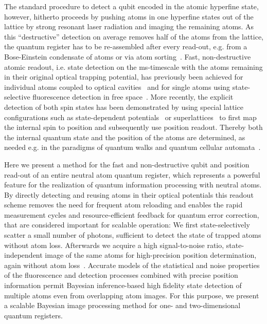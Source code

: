 \documentclass[aps,prl,twocolumn,english,showpacs]{revtex4-1}
\begin{document}
The standard procedure to detect a qubit encoded in the atomic hyperfine state, however, hitherto proceeds by pushing atoms in one hyperfine states out of the lattice by strong resonant laser radiation and imaging the remaining atoms. As this ``destructive'' detection on average removes half of the atoms from the lattice, the quantum register has to be re-assembled after every read-out, e.g. from a Bose-Einstein condensate of atoms or via atom sorting~\cite{Robens2017sorting}. 
Fast, non-destructive atomic readout, i.e. state detection on the ms-timescale with the atoms remaining in their original optical trapping potential, has previously been achieved for individual atoms coupled to optical cavities~\cite{gehr2010,bochmann2010,reick2010} and for single atoms using state-selective fluorescence detection in free space~\cite{gibbons2011,fuhrmanek2011}. More recently, the explicit detection of both spin states has been demonstrated by using special lattice configurations such as state-dependent potentials~\cite{robens2017atomic} or superlattices~\cite{boll2016spin} to first map the internal spin to position and subsequently use position readout. Thereby both the internal quantum state and the position of the atoms are determined, as needed e.g. in the paradigms of quantum walks and quantum cellular automata~\cite{robens2017atomic,Meyer1996,karski2009quantum}.

Here we present a method for the fast and non-destructive qubit and position read-out of an entire neutral atom quantum register, which represents a powerful feature for the realization of quantum information processing with neutral atoms. By directly detecting and reusing atoms in their optical potentials this readout scheme removes the need for frequent atom reloading and enables the rapid measurement cycles and resource-efficient feedback for quantum error correction, that are considered important for scalable operation: We first state-selectively scatter a small number of photons, sufficient to detect the state of trapped atoms without atom loss. Afterwards we acquire a high signal-to-noise ratio, state-independent image of the same atoms for high-precision position determination, again without atom loss~\cite{Alberti2016SuperResolution}. Accurate models of the statistical and noise properties of the fluorescence and detection processes combined with precise position information permit Bayesian inference-based high fidelity state detection of multiple atoms even from overlapping atom images. For this purpose, we present a scalable Bayesian image processing method for one- and two-dimensional quantum registers.
\end{document}

